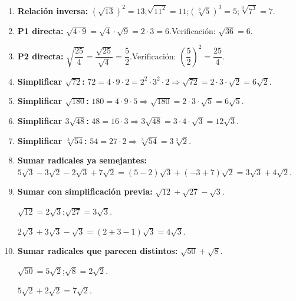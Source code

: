 \documentclass[11pt, letterpaper]{article}
\begin{document}
\begin{tcolorbox}[examplebox, title={Ejemplos}]
\begin{enumerate}[label=\textbf{Ej. \arabic*.}, leftmargin=*]

\item \textbf{Relación inversa:} $(\sqrt{13})^2=13$;\quad $\sqrt{11^2}=11$;\quad $(\sqrt[3]{5})^3=5$;\quad $\sqrt[3]{7^3}=7$.

\item \textbf{P1 directa:} $\sqrt{4\cdot 9}=\sqrt{4}\cdot\sqrt{9}=2\cdot 3=6$.\quad Verificación: $\sqrt{36}=6$. \checkmark

\item \textbf{P2 directa:} $\sqrt{\dfrac{25}{4}}=\dfrac{\sqrt{25}}{\sqrt{4}}=\dfrac{5}{2}$.\quad Verificación: $\left(\dfrac{5}{2}\right)^2=\dfrac{25}{4}$. \checkmark

\item \textbf{Simplificar $\sqrt{72}$:} $72=4\cdot 9\cdot 2=2^2\cdot 3^2\cdot 2 \Rightarrow \sqrt{72}=2\cdot 3\cdot\sqrt{2}=6\sqrt{2}$.

\item \textbf{Simplificar $\sqrt{180}$:} $180=4\cdot 9\cdot 5 \Rightarrow \sqrt{180}=2\cdot 3\cdot\sqrt{5}=6\sqrt{5}$.

\item \textbf{Simplificar $3\sqrt{48}$:} $48=16\cdot 3 \Rightarrow 3\sqrt{48}=3\cdot 4\cdot\sqrt{3}=12\sqrt{3}$.

\item \textbf{Simplificar $\sqrt[3]{54}$:} $54=27\cdot 2 \Rightarrow \sqrt[3]{54}=3\sqrt[3]{2}$.

\item \textbf{Sumar radicales ya semejantes:} $5\sqrt{3}-3\sqrt{2}-2\sqrt{3}+7\sqrt{2}=(5-2)\sqrt{3}+(-3+7)\sqrt{2}=3\sqrt{3}+4\sqrt{2}$.

\item \textbf{Sumar con simplificación previa:} $\sqrt{12}+\sqrt{27}-\sqrt{3}$.

$\sqrt{12}=2\sqrt{3}$;\quad $\sqrt{27}=3\sqrt{3}$.

$2\sqrt{3}+3\sqrt{3}-\sqrt{3}=(2+3-1)\sqrt{3}=4\sqrt{3}$.

\item \textbf{Sumar radicales que parecen distintos:} $\sqrt{50}+\sqrt{8}$.

$\sqrt{50}=5\sqrt{2}$;\quad $\sqrt{8}=2\sqrt{2}$.

$5\sqrt{2}+2\sqrt{2}=7\sqrt{2}$.

\end{enumerate}
\end{tcolorbox}
\end{document}
